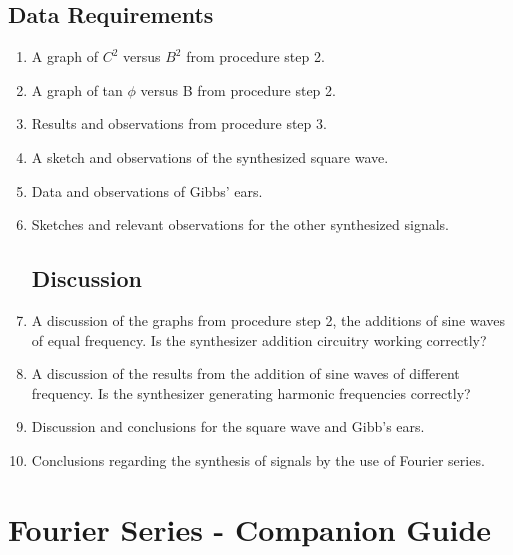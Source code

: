 \section{{\bf Data Requirements}}
\begin{enumerate}[resume]

\item A graph of $C^2$ versus $B^2$ from procedure step 2.

\item A graph of tan $\phi$ versus B from procedure step 2.

\item Results and observations from procedure step 3. 

\item A sketch and observations of the synthesized square wave.

\item Data and observations of Gibbs' ears.

\item Sketches and relevant observations for the other synthesized signals.

\section{Discussion}

\item A discussion of the graphs from procedure step 2, the additions of sine waves of equal frequency. Is the synthesizer addition circuitry working correctly?

\item A discussion of the results from the addition of sine waves of different frequency. Is the synthesizer generating harmonic frequencies correctly?

\item Discussion and conclusions for the square wave and Gibb's ears.

\item Conclusions regarding the synthesis of signals by the use of Fourier series.

\end{enumerate}


\AtEndDocument{\clearpage\ifodd\value{page}\else\null\clearpage\fi} %


\chapter{Fourier Series - Companion Guide}

